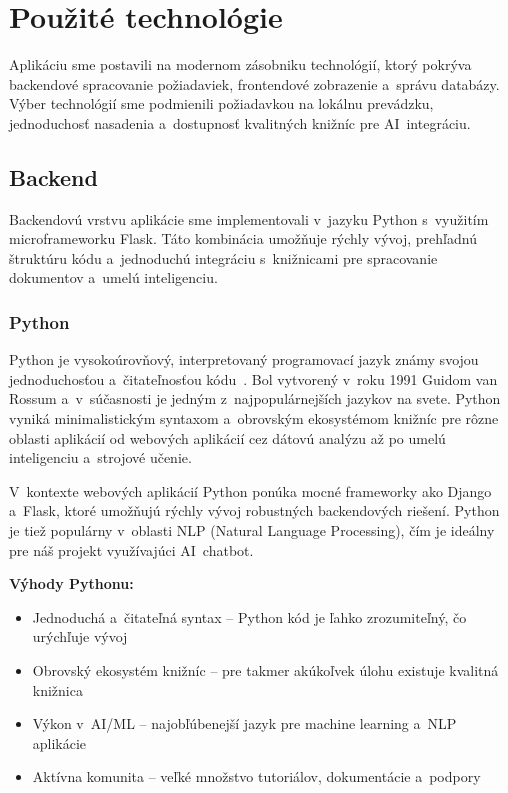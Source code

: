 \chapter{Použité technológie}

        Aplikáciu sme postavili na modernom zásobniku technológií, ktorý pokrýva backendové
spracovanie požiadaviek, frontendové zobrazenie a~správu databázy. Výber technológií sme
podmienili požiadavkou na lokálnu prevádzku, jednoduchosť nasadenia a~dostupnosť
kvalitných knižníc pre AI~integráciu.

\section{Backend}

        Backendovú vrstvu aplikácie sme implementovali v~jazyku Python s~využitím
microframeworku Flask. Táto kombinácia umožňuje rýchly vývoj, prehľadnú štruktúru kódu
a~jednoduchú integráciu s~knižnicami pre spracovanie dokumentov a~umelú inteligenciu.

\subsection{Python}

        Python je vysokoúrovňový, interpretovaný programovací jazyk známy svojou
jednoduchosťou a~čitateľnosťou kódu~\cite{python_org}. Bol vytvorený v~roku 1991 Guidom van Rossum a~v~súčasnosti
je jedným z~najpopulárnejších jazykov na svete. Python vyniká minimalistickým syntaxom
a~obrovským ekosystémom knižníc pre rôzne oblasti aplikácií od webových aplikácií cez
dátovú analýzu až po umelú inteligenciu a~strojové učenie.

        V~kontexte webových aplikácií Python ponúka mocné frameworky ako Django a~Flask,
ktoré umožňujú rýchly vývoj robustných backendových riešení. Python je tiež populárny
v~oblasti NLP (Natural Language Processing), čím je ideálny pre náš projekt využívajúci
AI~chatbot.

        \textbf{Výhody Pythonu:}

\begin{itemize}
  \item Jednoduchá a~čitateľná syntax -- Python kód je ľahko zrozumiteľný, čo urýchľuje vývoj
  \item Obrovský ekosystém knižníc -- pre takmer akúkoľvek úlohu existuje kvalitná knižnica
  \item Výkon v~AI/ML -- najobľúbenejší jazyk pre machine learning a~NLP aplikácie
  \item Aktívna komunita -- veľké množstvo tutoriálov, dokumentácie a~podpory
\end{itemize}

